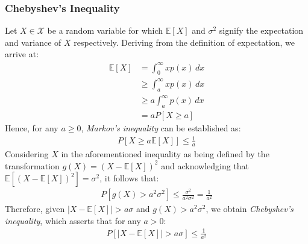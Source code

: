 \documentclass[journal,12pt,onecolumn,draftclsnofoot,]{IEEEtran}
\begin{document}
	\subsubsection{Chebyshev's Inequality}
	Let \(X \in \mathcal{X}\) be a random variable for which \( \mathbb{E}[X]\) and \(\sigma^2\) signify the expectation and variance of \(X\) respectively. Deriving from the definition of expectation, we arrive at:
	\begin{equation}
		\begin{split}
			\mathbb{E}[X] & = \int_{0}^{\infty} x p(x) \, dx  \\
			& \geq \int_{a}^{\infty} x p(x) \, dx  \\
			& \geq a \int_{a}^{\infty} p(x) \, dx \\
			& = a P[X \geq a]
		\end{split}
	\end{equation}
	Hence, for any \(a \geq 0\), \emph{Markov's inequality} can be established as:
	\begin{equation}
		\begin{split}
			P[X \geq a \mathbb{E}[X]] \leq \frac{1}{a}
		\end{split}
	\end{equation}
	Considering \(X\) in the aforementioned inequality as being defined by the transformation \(g(X) = (X - \mathbb{E}[X])^2\) and acknowledging that \(\mathbb{E}[(X - \mathbb{E}[X])^2] = \sigma^2\), it follows that:
	\begin{equation}
		\begin{split}
			P[g(X) > a^2 \sigma^2] \leq \frac{\sigma^2}{a^2 \sigma^2} = \frac{1}{a^2}
		\end{split}
	\end{equation}
	Therefore, given \(|X - \mathbb{E}[X]| > a \sigma\) and \(g(X) > a^2 \sigma^2\), we obtain \emph{Chebyshev's inequality}, which asserts that for any \(a > 0\):
	\begin{equation}
		\begin{split}
			P[|X - \mathbb{E}[X]| > a \sigma] \leq \frac{1}{a^2}
		\end{split}
	\end{equation}
	
	
\end{document}
